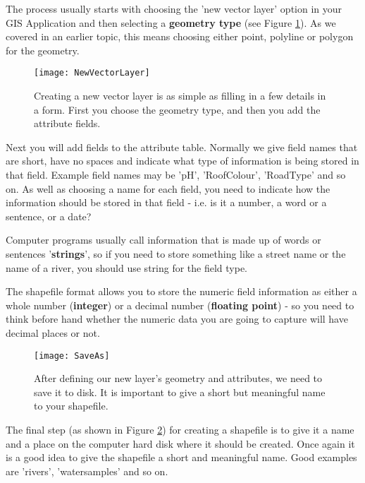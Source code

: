 The process usually starts with choosing the 'new vector layer' option in
your GIS Application and then selecting a \textbf{geometry type} (see Figure
\ref{fig:newshape}). As we covered in an earlier topic, this means choosing
either point, polyline or polygon for the geometry. 

\begin{figure}[ht]
   \begin{center}
   \caption{Creating a new vector layer is as simple as filling in a few
details in a form. First you choose the geometry type, and then you add the
attribute fields.}
\label{fig:newshape}\smallskip
   \texttt{[image: NewVectorLayer]}
\end{center}
\end{figure}

Next you will add fields to the attribute table. Normally we give field names
that are short, have no spaces and indicate what type of information is being
stored in that field. Example field names may be 'pH', 'RoofColour',
'RoadType' and so on. As well as choosing a name for each field, you need to
indicate how the information should be stored in that field - i.e. is it a
number, a word or a sentence, or a date? 

Computer programs usually call information that is made up of words or
sentences '\textbf{strings}', so if you need to store something like a street name or
the name of a river, you should use string for the field type.

The shapefile format allows you to store the numeric field information as
either a whole number (\textbf{integer}) or a decimal number
(\textbf{floating point}) - so you
need to think before hand whether the numeric data you are going to capture
will have decimal places or not.

\begin{figure}[ht]
   \begin{center}
   \caption{After defining our new layer's geometry and attributes, we need
to save it to disk. It is important to give a short but meaningful name to
your shapefile.}
\label{fig:saveas}\smallskip
   \texttt{[image: SaveAs]}
\end{center}
\end{figure}

The final step (as shown in Figure \ref{fig:saveas}) for creating a shapefile
is
to give it a name and a place on the computer hard disk where it should be
created. Once again it is a good idea to give the shapefile a short and
meaningful name. Good examples are 'rivers', 'watersamples' and so on.

